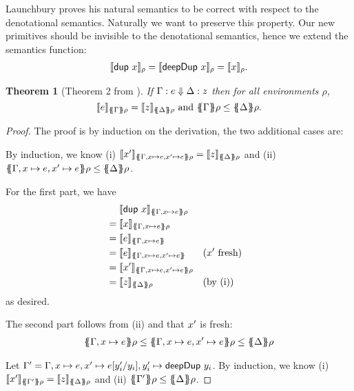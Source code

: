 \documentclass[preprint]{sigplanconf}
\newtheorem{theorem}{Theorem}
\theoremstyle{nonumberplain}
\newtheorem{proof}{Proof}
\begin{document}
Launchbury proves his natural semantics to be correct with respect to the denotational semantics. 
Naturally we want to preserve this property. Our new primitives should be invisible to the denotational semantics, hence we extend the semantics function:
\begin{align*}
\llbracket \text{\textsf{dup}}\ x \rrbracket_{\rho} = \llbracket \text{\textsf{deepDup}}\ x \rrbracket_{\rho} = \llbracket x \rrbracket_{\rho}.
\end{align*}

\begin{theorem}[Theorem 2 from \citep{launchbury}]
If $\Gamma : e \Downarrow \Delta : z$ then for all environments $\rho$,
\[
\dsem e {\esem \Gamma \rho} = \dsem z {\esem \Delta \rho}
\text{ and }
\esem \Gamma \rho \le \esem \Delta \rho.
\]
\end{theorem}
\begin{proof}
The proof is by induction on the derivation, the two additional cases are:

By induction, we know (i) $\dsem{\fresh x}{\esem{\Gamma, x \mapsto e, \fresh x \mapsto e} \rho} = \dsem{z}{\esem \Delta \rho}$ and (ii) $\esem{\Gamma, x \mapsto e, \fresh x \mapsto e} \rho \le \esem \Delta \rho$.

For the first part, we have 
\begin{align*}
&\phantom{{}={}}\dsem{\sDup x}{\esem{\Gamma, x\mapsto e}\rho}\\
&= \dsem{x}{\esem{\Gamma, x\mapsto e}\rho}\\
&= \dsem{e}{\esem{\Gamma, x\mapsto e}}\\
&= \dsem{e}{\esem{\Gamma, x\mapsto e, \fresh x \mapsto e}} && \text{($\fresh x$ fresh)}\\
&= \dsem{\fresh x}{\esem{\Gamma, x\mapsto e, \fresh x \mapsto e}\rho} \\
&= \dsem{z}{\esem \Delta \rho} &&\text{(by (i))}
\end{align*}
as desired.

The second part follows from (ii) and that $x'$ is fresh:
\begin{align*}
\esem{\Gamma, x\mapsto e}\rho \le \esem{\Gamma, x\mapsto e, \fresh x\mapsto e} \rho \le \esem{\Delta}\rho
\end{align*}

Let \mbox{$\Gamma' = \Gamma, x\mapsto e, x'\mapsto e[y'_i/y_i], y'_i \mapsto \text{\textsf{deepDup}}\ y_i$}.
By induction, we know (i) $\dsem{\fresh x}{\esem{\Gamma'} \rho} = \dsem{z}{\esem \Delta \rho}$ and (ii) $\esem{\Gamma'} \rho \le \esem \Delta \rho$.


\end{proof}
\end{document}
